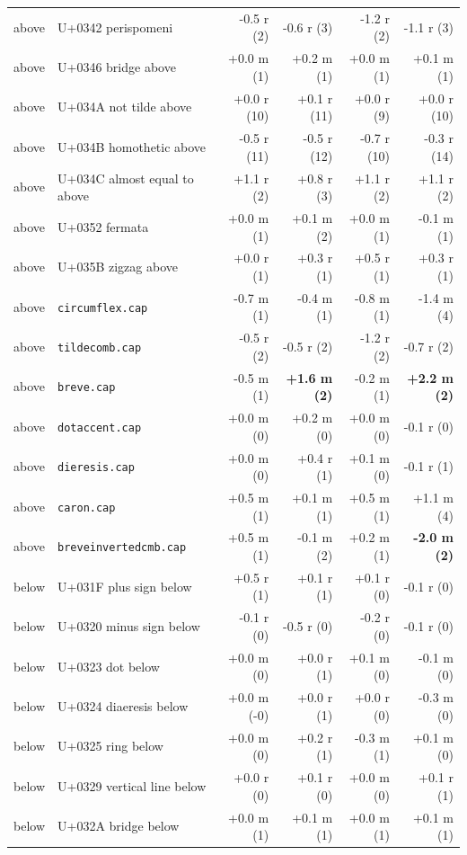 \documentclass[10pt]{article}
\begin{document}
{\begin{longtable}{@{}llrrrr@{}}
above & U+0342 perispomeni & -0.5 r (2) & -0.6 r (3) & -1.2 r (2) & -1.1 r (3)\\
above & U+0346 bridge above & +0.0 m (1) & +0.2 m (1) & +0.0 m (1) & +0.1 m (1)\\
above & U+034A not tilde above & +0.0 r (10) & +0.1 r (11) & +0.0 r (9) & +0.0 r (10)\\
above & U+034B homothetic above & -0.5 r (11) & -0.5 r (12) & -0.7 r (10) & -0.3 r (14)\\
above & U+034C almost equal to above & +1.1 r (2) & +0.8 r (3) & +1.1 r (2) & +1.1 r (2)\\
above & U+0352 fermata & +0.0 m (1) & +0.1 m (2) & +0.0 m (1) & -0.1 m (1)\\
above & U+035B zigzag above & +0.0 r (1) & +0.3 r (1) & +0.5 r (1) & +0.3 r (1)\\
above & \verb|circumflex.cap| & -0.7 m (1) & -0.4 m (1) & -0.8 m (1) & -1.4 m (4)\\
above & \verb|tildecomb.cap| & -0.5 r (2) & -0.5 r (2) & -1.2 r (2) & -0.7 r (2)\\
above & \verb|breve.cap| & -0.5 m (1) & \textbf{+1.6 m (2)} & -0.2 m (1) & \textbf{+2.2 m (2)}\\
above & \verb|dotaccent.cap| & +0.0 m (0) & +0.2 m (0) & +0.0 m (0) & -0.1 r (0)\\
above & \verb|dieresis.cap| & +0.0 m (0) & +0.4 r (1) & +0.1 m (0) & -0.1 r (1)\\
above & \verb|caron.cap| & +0.5 m (1) & +0.1 m (1) & +0.5 m (1) & +1.1 m (4)\\
above & \verb|breveinvertedcmb.cap| & +0.5 m (1) & -0.1 m (2) & +0.2 m (1) & \textbf{-2.0 m (2)}\\
below & U+031F plus sign below & +0.5 r (1) & +0.1 r (1) & +0.1 r (0) & -0.1 r (0)\\
below & U+0320 minus sign below & -0.1 r (0) & -0.5 r (0) & -0.2 r (0) & -0.1 r (0)\\
below & U+0323 dot below & +0.0 m (0) & +0.0 r (1) & +0.1 m (0) & -0.1 m (0)\\
below & U+0324 diaeresis below & +0.0 m (-0) & +0.0 r (1) & +0.0 r (0) & -0.3 m (0)\\
below & U+0325 ring below & +0.0 m (0) & +0.2 r (1) & -0.3 m (1) & +0.1 m (0)\\
below & U+0329 vertical line below & +0.0 r (0) & +0.1 r (0) & +0.0 m (0) & +0.1 r (1)\\
below & U+032A bridge below & +0.0 m (1) & +0.1 m (1) & +0.0 m (1) & +0.1 m (1)\\

\end{longtable}}
\end{document}
